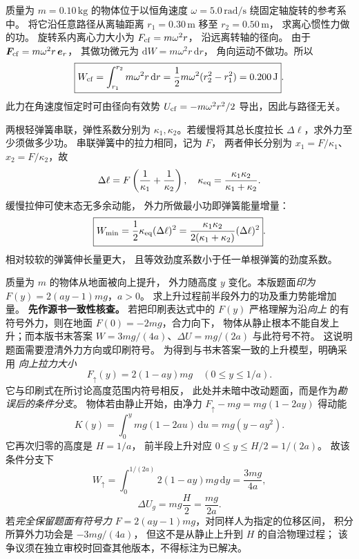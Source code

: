 质量为 $m=0.10\,\mathrm{kg}$ 的物体位于以恒角速度
$\omega=5.0\,\mathrm{rad/s}$ 绕固定轴旋转的参考系中。
将它沿任意路径从离轴距离 $r_1=0.30\,\mathrm m$
移至 $r_2=0.50\,\mathrm m$，
求离心惯性力做的功。
\exsolution
旋转系内离心力大小为 $F_{\rm cf}=m\omega^2r$，
沿远离转轴的径向。
由于 $\bm F_{\rm cf}=m\omega^2r\,\bm e_r$，
其做功微元为
$\mathrm dW=m\omega^2r\,\mathrm dr$，
角向运动不做功。所以
\[
\boxed{W_{\rm cf}=\int_{r_1}^{r_2}
m\omega^2r\,\mathrm dr
=\frac12m\omega^2(r_2^2-r_1^2)
=0.200\,\mathrm J}.
\]
\excheck 此力在角速度恒定时可由径向有效势
$U_{\rm cf}=-m\omega^2r^2/2$ 导出，因此与路径无关。

两根轻弹簧串联，弹性系数分别为
$\kappa_1,\kappa_2$。若缓慢将其总长度拉长
$\Delta\ell$，求外力至少须做多少功。
\exsolution
串联弹簧中的拉力相同，记为 $F$，
两者伸长分别为 $x_1=F/\kappa_1$、
$x_2=F/\kappa_2$，故
\[
\Delta\ell=F\left(\frac1{\kappa_1}+\frac1{\kappa_2}\right),
\quad
\kappa_{\rm eq}=\frac{\kappa_1\kappa_2}{\kappa_1+\kappa_2}.
\]
缓慢拉伸可使末态无多余动能，
外力所做最小功即弹簧能量增量：
\[
\boxed{W_{\min}=
\frac12\kappa_{\rm eq}(\Delta\ell)^2
=\frac{\kappa_1\kappa_2}{2(\kappa_1+\kappa_2)}
(\Delta\ell)^2}.
\]
\excheck 相对较软的弹簧伸长量更大，
且等效劲度系数小于任一单根弹簧的劲度系数。

质量为 $m$ 的物体从地面被向上提升，
外力随高度 $y$ 变化。本版题面\emph{印为}
$F(y)=2(ay-1)mg$，$a>0$。
求上升过程前半段外力的功及重力势能增加量。
\exsolution
\textbf{先作源书一致性核查。}
若把印刷表达式中的 $F(y)$ 严格理解为沿\emph{向上}
的有符号外力，则在地面 $F(0)=-2mg$，合力向下，
物体从静止根本不能自发上升；而本版书末答案
$W=3mg/(4a)$、$\Delta U=mg/(2a)$ 与此符号不符。
这说明题面需要澄清外力方向或印刷符号。
为得到与书末答案一致的上升模型，明确采用
\emph{向上拉力大小}
\[
F_{\uparrow}(y)=2(1-ay)mg
\quad(0\le y\le 1/a).
\]
它与印刷式在所讨论高度范围内符号相反，
此处并未暗中改动题面，而是作为\emph{勘误后的条件分支}。
物体若由静止开始，由净力
$F_\uparrow-mg=mg(1-2ay)$ 得动能
\[
K(y)=\int_0^y mg(1-2au)\,\mathrm du
=mg(y-ay^2).
\]
它再次归零的高度是 $H=1/a$，
前半段上升对应 $0\le y\le H/2=1/(2a)$。
故该条件分支下
\[
\boxed{W_\uparrow=\int_0^{1/(2a)}2(1-ay)mg\,\mathrm dy
=\frac{3mg}{4a}},
\]
\[
\boxed{\Delta U_g=mg\frac{H}{2}=\frac{mg}{2a}}.
\]
\excheck 若\emph{完全保留题面有符号力}
$F=2(ay-1)mg$，对同样人为指定的位移区间，
积分所算外力功会是 $-3mg/(4a)$，
但这不是从静止上升到 $H$ 的自洽物理过程；
该争议须在独立审校时回查其他版本，不得标注为已解决。

